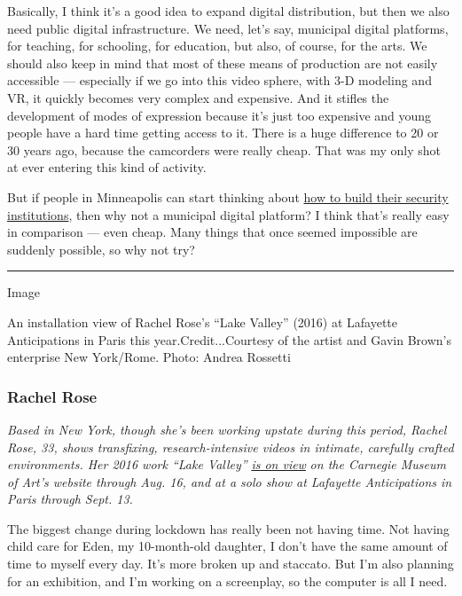 Basically, I think it's a good idea to expand digital distribution, but
then we also need public digital infrastructure. We need, let's say,
municipal digital platforms, for teaching, for schooling, for education,
but also, of course, for the arts. We should also keep in mind that most
of these means of production are not easily accessible --- especially if
we go into this video sphere, with 3-D modeling and VR, it quickly
becomes very complex and expensive. And it stifles the development of
modes of expression because it's just too expensive and young people
have a hard time getting access to it. There is a huge difference to 20
or 30 years ago, because the camcorders were really cheap. That was my
only shot at ever entering this kind of activity.

But if people in Minneapolis can start thinking about
\href{https://www.nytimes3xbfgragh.onion/2020/06/07/us/minneapolis-police-abolish.html}{how
to build their security institutions}, then why not a municipal digital
platform? I think that's really easy in comparison --- even cheap. Many
things that once seemed impossible are suddenly possible, so why not
try?

\begin{center}\rule{0.5\linewidth}{\linethickness}\end{center}

Image

An installation view of Rachel Rose's ``Lake Valley'' (2016) at
Lafayette Anticipations in Paris this year.Credit...Courtesy of the
artist and Gavin Brown's enterprise New York/Rome. Photo: Andrea
Rossetti

\hypertarget{rachel-rose}{%
\subsubsection{\texorpdfstring{\textbf{Rachel
Rose}}{Rachel Rose}}\label{rachel-rose}}

\emph{Based in New York, though she's been working upstate during this
period, Rachel Rose, 33, shows transfixing, research-intensive videos in
intimate, carefully crafted environments. Her 2016 work ``Lake Valley''}
\href{https://cmoa.org/exhibition/rachel-rose/}{\emph{is on view}}
\emph{on the Carnegie Museum of Art's website through Aug. 16, and at a
solo show at Lafayette Anticipations in Paris through Sept. 13.}

The biggest change during lockdown has really been not having time. Not
having child care for Eden, my 10-month-old daughter, I don't have the
same amount of time to myself every day. It's more broken up and
staccato. But I'm also planning for an exhibition, and I'm working on a
screenplay, so the computer is all I need.


